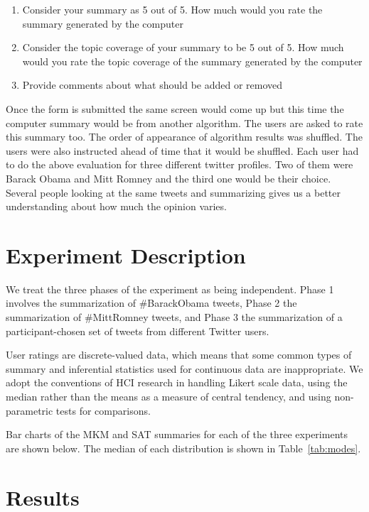 \begin{enumerate}
\item Consider your summary as 5 out of 5. How much would you rate the summary generated by the computer
\item Consider the topic coverage of your summary to be 5 out of 5. How much would you rate the topic coverage of the summary generated by the computer
\item Provide comments about what should be added or removed
\end{enumerate}

Once the form is submitted the same screen would come up but this time the computer summary would be from another algorithm. The users are asked to rate this summary too. The order of appearance of algorithm results was shuffled. The users were also instructed ahead of time that it would be shuffled. Each user had to do the above evaluation for three different twitter profiles. Two of them were Barack Obama and Mitt Romney and the third one would be their choice. Several people looking at the same tweets and summarizing gives us a better understanding about how much the opinion varies. 

\section{Experiment Description}

We treat the three phases of the experiment as being independent.
Phase 1 involves the summarization of \#BarackObama tweets, Phase 2
the summarization of \#MittRomney tweets, and Phase 3 the
summarization of a participant-chosen set of tweets from different
Twitter users.

User ratings are discrete-valued data, which means that some common
types of summary and inferential statistics used for continuous data
are inappropriate.  We adopt the conventions of HCI research in
handling Likert scale data, using the median rather than the means as
a measure of central tendency, and using non-parametric tests for
comparisons.

Bar charts of the MKM and SAT summaries for each of the three
experiments are shown below.  The median of each distribution is shown
in Table~\ref{tab:modes}.

\section{Results}

